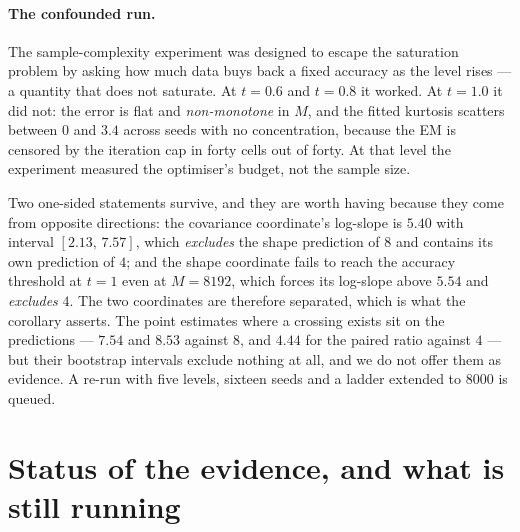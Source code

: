 \documentclass[11pt,a4paper]{article}
\begin{document}
\paragraph{The confounded run.} The sample-complexity experiment was designed to escape the
saturation problem by asking how much data buys back a fixed accuracy as the level rises --- a
quantity that does not saturate. At $t=0.6$ and $t=0.8$ it worked. At $t=1.0$ it did not: the
error is flat and \emph{non-monotone} in $M$, and the fitted kurtosis scatters between $0$ and
$3.4$ across seeds with no concentration, because the EM is censored by the iteration cap in forty
cells out of forty. At that level the experiment measured the optimiser's budget, not the sample
size.

Two one-sided statements survive, and they are worth having because they come from opposite
directions: the covariance coordinate's log-slope is $5.40$ with interval $[2.13,\,7.57]$, which
\emph{excludes} the shape prediction of $8$ and contains its own prediction of $4$; and the shape
coordinate fails to reach the accuracy threshold at $t=1$ even at $M=8192$, which forces its
log-slope above $5.54$ and \emph{excludes} $4$. The two coordinates are therefore separated, which
is what the corollary asserts. The point estimates where a crossing exists sit on the predictions
--- $7.54$ and $8.53$ against $8$, and $4.44$ for the paired ratio against $4$ --- but their
bootstrap intervals exclude nothing at all, and we do not offer them as evidence. A re-run with
five levels, sixteen seeds and a ladder extended to $8000$ is queued.

\section{Status of the evidence, and what is still running}\label{sec:status}
\end{document}
